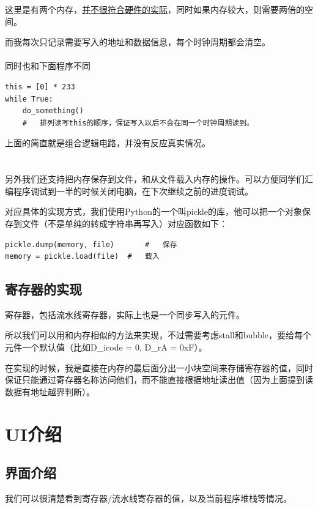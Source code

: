 \documentclass{article}
\begin{document}
这里是有两个内存，\underline{并不很符合硬件的实际}，同时如果内存较大，则需要两倍的空间。

而我每次只记录需要写入的地址和数据信息，每个时钟周期都会清空。\\\\
\indent 同时也和下面程序不同
\begin{lstlisting}[frame=single]
this = [0] * 233
while True:
	do_something()
	#	排列读写this的顺序，保证写入以后不会在同一个时钟周期读到。
\end{lstlisting}

上面的简直就是组合逻辑电路，并没有反应真实情况。
\\
\\
\\
\indent 另外我们还支持把内存保存到文件，和从文件载入内存的操作。可以方便同学们汇编程序调试到一半的时候关闭电脑，在下次继续之前的进度调试。

对应具体的实现方式，我们使用Python的一个叫pickle的库，他可以把一个对象保存到文件（不是单纯的转成字符串再写入）对应函数如下：
\begin{lstlisting}[frame=single]
pickle.dump(memory, file)		#	保存
memory = pickle.load(file)	#	载入
\end{lstlisting}

\subsection{寄存器的实现}
寄存器，包括流水线寄存器，实际上也是一个同步写入的元件。

所以我们可以用和内存相似的方法来实现，不过需要考虑stall和bubble，要给每个元件一个默认值（比如D\_icode = 0, D\_rA = 0xF）。

在实现的时候，我是直接在内存的最后面分出一小块空间来存储寄存器的值，同时保证只能通过寄存器名称访问他们，而不能直接根据地址读出值（因为上面提到读数据有地址越界判断）。

\section{UI介绍}
\subsection{界面介绍}
我们可以很清楚看到寄存器/流水线寄存器的值，以及当前程序堆栈等情况。
\end{document}
